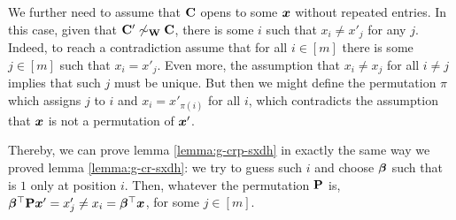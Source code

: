We further need to assume that $\mathbf{{C}}$ opens to some ${\boldsymbol{x}}$ without repeated entries. In this case, given that $\mathbf{{C}}'\not\sim_{\mathbf{{W}}}\mathbf{{C}}$, there is some $i$ such that $x_i\neq x'_j$ for any $j$. Indeed, to reach a contradiction assume that for all $i\in[m]$ there is some $j\in[m]$ such that $x_i=x'_j$. Even more, the assumption that $x_i\neq x_j$ for all $i\neq j$ implies that such $j$ must be unique. But then we might define the permutation $\pi$ which assigns $j$ to $i$ and $x_i = x'_{\pi(i)}$ for all $i$, which contradicts the assumption that ${\boldsymbol{x}}$ is not a permutation of ${\boldsymbol{x}}'$.

Thereby, we can prove lemma \ref{lemma:g-crp-sxdh} in exactly the same way we proved lemma \ref{lemma:g-cr-sxdh}: we try to guess such $i$ and choose ${\boldsymbol{\beta}}$ such that is $1$ only at position $i$. Then, whatever the permutation $\mathbf{{P}}$ is, ${\boldsymbol{\beta}}^\top\mathbf{{P}}{\boldsymbol{x}}' = x'_j \neq x_i = {\boldsymbol{\beta}}^\top{\boldsymbol{x}}$, for some $j\in[m]$.

